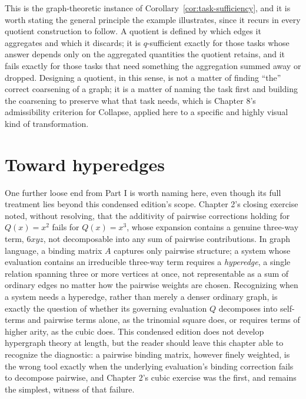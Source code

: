 \documentclass[11pt]{book}
\begin{document}
This is the graph-theoretic instance of Corollary~\ref{cor:task-sufficiency}, and it is worth stating the general principle the example illustrates, since it recurs in every quotient construction to follow. A quotient is defined by which edges it aggregates and which it discards; it is $q$-sufficient exactly for those tasks whose answer depends only on the aggregated quantities the quotient retains, and it fails exactly for those tasks that need something the aggregation summed away or dropped. Designing a quotient, in this sense, is not a matter of finding ``the'' correct coarsening of a graph; it is a matter of naming the task first and building the coarsening to preserve what that task needs, which is Chapter 8's admissibility criterion for Collapse, applied here to a specific and highly visual kind of transformation.

\section{Toward hyperedges}

One further loose end from Part I is worth naming here, even though its full treatment lies beyond this condensed edition's scope. Chapter 2's closing exercise noted, without resolving, that the additivity of pairwise corrections holding for $Q(x)=x^2$ fails for $Q(x)=x^3$, whose expansion contains a genuine three-way term, $6xyz$, not decomposable into any sum of pairwise contributions. In graph language, a binding matrix $A$ captures only pairwise structure; a system whose evaluation contains an irreducible three-way term requires a \emph{hyperedge}, a single relation spanning three or more vertices at once, not representable as a sum of ordinary edges no matter how the pairwise weights are chosen. Recognizing when a system needs a hyperedge, rather than merely a denser ordinary graph, is exactly the question of whether its governing evaluation $Q$ decomposes into self-terms and pairwise terms alone, as the trinomial square does, or requires terms of higher arity, as the cubic does. This condensed edition does not develop hypergraph theory at length, but the reader should leave this chapter able to recognize the diagnostic: a pairwise binding matrix, however finely weighted, is the wrong tool exactly when the underlying evaluation's binding correction fails to decompose pairwise, and Chapter 2's cubic exercise was the first, and remains the simplest, witness of that failure.
\end{document}

